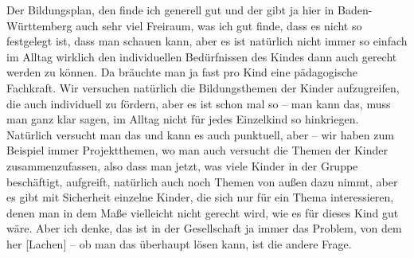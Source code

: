 \begin{linenumbers*}
Der Bildungsplan, den finde ich generell gut und der gibt ja hier in Baden-Württemberg auch sehr viel Freiraum, was ich gut finde, dass es nicht so festgelegt ist, dass man schauen kann, aber es ist natürlich nicht immer so einfach im Alltag wirklich den individuellen Bedürfnissen des Kindes dann auch gerecht werden zu können. Da bräuchte man ja fast pro Kind eine pädagogische Fachkraft. Wir versuchen natürlich die Bildungsthemen der Kinder aufzugreifen, die auch individuell zu fördern, aber es ist schon mal so – man kann das, muss man ganz klar sagen, im Alltag nicht für jedes Einzelkind so hinkriegen. Natürlich versucht man das und kann es auch punktuell, aber – wir haben zum Beispiel immer Projektthemen, wo man auch versucht die Themen der Kinder zusammenzufassen, also dass man jetzt, was viele Kinder in der Gruppe beschäftigt, aufgreift, natürlich auch noch Themen von außen dazu nimmt, aber es gibt mit Sicherheit einzelne Kinder, die sich nur für ein Thema interessieren, denen man in dem Maße vielleicht nicht gerecht wird, wie es für dieses Kind gut wäre.  
Aber ich denke, das ist in der Gesellschaft ja immer das Problem, von dem her {[Lachen]} – ob man das überhaupt lösen kann, ist die andere Frage. 


\end{linenumbers*}
